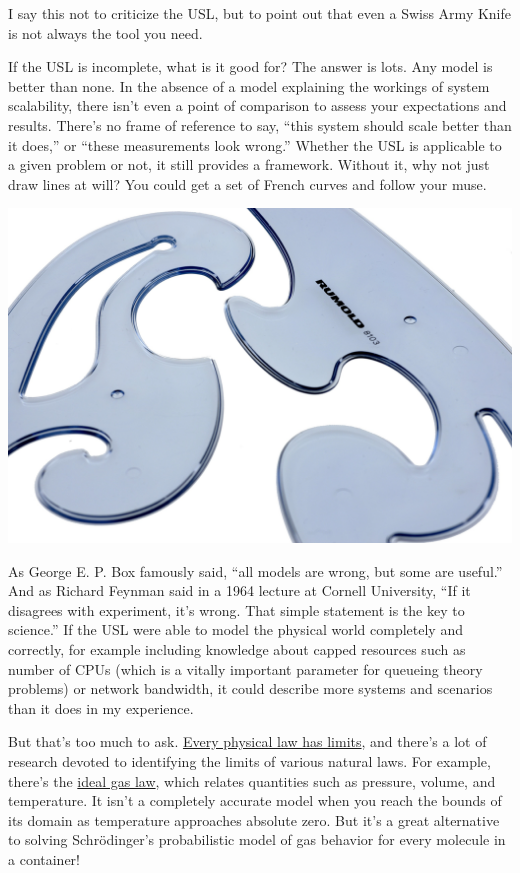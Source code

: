 \documentclass{vivid_layout}
\begin{document}
I say this not to criticize the USL, but to point out that even a Swiss Army
Knife is not always the tool you need.

If the USL is incomplete, what is it good for? The answer is lots.
Any model is better than none. In the absence of a model
explaining the workings of system scalability, there isn't even a point of
comparison to assess your expectations and results. There's no frame of
reference to say, ``this system should scale better than it does,'' or
``these measurements look wrong.'' Whether the USL is applicable to a
given problem or not, it still provides a framework. Without it, why not just
draw lines at will? You could get a set of French curves and follow your muse.
\begin{center}
\includegraphics[width=.75\linewidth,trim={0 8cm 0 0},clip]{scalability/french_curve}
\end{center}

As George E. P. Box famously said, ``all models are wrong, but some are
useful.'' And as Richard Feynman said in a 1964 lecture at Cornell University,
``If it disagrees with experiment, it’s wrong.  That simple statement is the key
to science.'' If the USL were able to model the physical world completely and
correctly, for example including knowledge about capped resources such as number
of CPUs (which is a vitally important parameter for queueing theory problems) or
network bandwidth, it could describe more systems and scenarios than
it does in my experience.

But that's too much to ask.
\href{https://en.wikipedia.org/wiki/Physical\_law#Laws\_as\_approximations}{Every
physical law has limits}, and there's a lot of research devoted to identifying
the limits of various natural laws. For example, there's the
\href{https://en.wikipedia.org/wiki/Ideal\_gas\_law}{ideal gas law}, which
relates quantities such as pressure, volume, and temperature.  It isn't a
completely accurate model when you reach the bounds of its domain as temperature
approaches absolute zero. But it's a great alternative to solving
Schr\"odinger's probabilistic model of gas behavior for every molecule in a
container!
\end{document}
